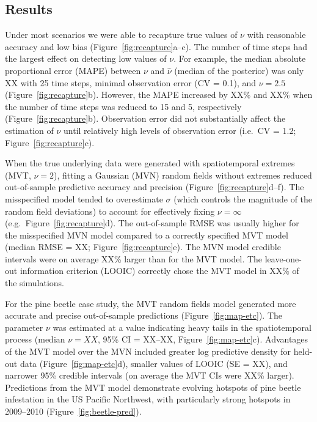 \documentclass[12pt,english]{article}
\begin{document}
\begin{spacing}{1.9}
\section{Results}

Under most scenarios we were able to recapture true values of $\nu$ with
reasonable accuracy and low bias (Figure~\ref{fig:recapture}a--c). The
number of time steps had the largest effect on detecting low values
of $\nu$. For example, the median absolute proportional error (MAPE) between
$\nu$ and $\hat{\nu}$ (median of the posterior) was only XX with 25 time steps,
minimal observation error (CV = 0.1), and $\nu = 2.5$
(Figure~\ref{fig:recapture}b). However, the MAPE increased by XX\% and XX\% when
the number of time steps was reduced to 15 and 5, respectively
(Figure~\ref{fig:recapture}b). Observation error did not substantially affect
the estimation of $\nu$ until relatively high levels of observation error
(i.e.\ CV = 1.2; Figure~\ref{fig:recapture}c).

When the true underlying data were generated with spatiotemporal extremes (MVT,
$\nu = 2$), fitting a Gaussian (MVN) random fields without extremes
reduced out-of-sample predictive accuracy and precision
(Figure~\ref{fig:recapture}d--f). The misspecified model tended to overestimate
$\sigma$ (which controls the magnitude of the random field deviations) to
account for effectively fixing $\nu = \infty$ (e.g.\ Figure~\ref{fig:recapture}d). The
out-of-sample RMSE was usually higher for the misspecified MVN model compared to
a correctly specified MVT model (median RMSE = XX; Figure~\ref{fig:recapture}e).
The MVN model credible intervals were on average XX\% larger than for the MVT
model. The leave-one-out information criterion (LOOIC) correctly chose the MVT
model in XX\% of the simulations.

For the pine beetle case study, the MVT random fields model generated more
accurate and precise out-of-sample predictions (Figure~\ref{fig:map-etc}). The
parameter $\nu$ was estimated at a value indicating
heavy tails in the spatiotemporal process (median
$\nu = XX$, 95\% CI = XX--XX, Figure~\ref{fig:map-etc}c). Advantages of the MVT
model over the MVN included greater log predictive density for held-out data
(Figure~\ref{fig:map-etc}d), smaller values of LOOIC (SE = XX), and narrower
95\% credible intervals (on average the MVT CIs were XX\% larger). Predictions
from the MVT model demonstrate evolving hotspots of pine beetle infestation in
the US Pacific Northwest, with particularly strong hotspots in 2009--2010
(Figure~\ref{fig:beetle-pred}).


\end{spacing}
\end{document}
